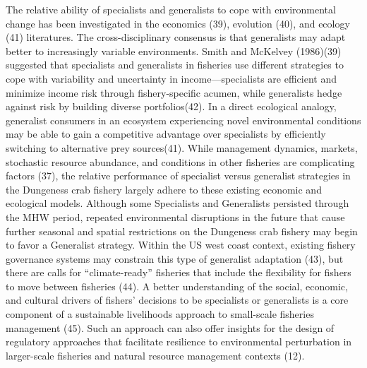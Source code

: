 \documentclass[9pt,twocolumn,twoside,lineno]{pnas-new}
\begin{document}
The relative ability of specialists and generalists to cope with
environmental change has been investigated in the economics (39),
evolution (40), and ecology (41) literatures. The cross-disciplinary
consensus is that generalists may adapt better to increasingly variable
environments. Smith and McKelvey (1986)(39) suggested that specialists
and generalists in fisheries use different strategies to cope with
variability and uncertainty in income---specialists are efficient and
minimize income risk through fishery-specific acumen, while generalists
hedge against risk by building diverse portfolios(42). In a direct
ecological analogy, generalist consumers in an ecosystem experiencing
novel environmental conditions may be able to gain a competitive
advantage over specialists by efficiently switching to alternative prey
sources(41). While management dynamics, markets, stochastic resource
abundance, and conditions in other fisheries are complicating factors
(37), the relative performance of specialist versus generalist
strategies in the Dungeness crab fishery largely adhere to these
existing economic and ecological models. Although some Specialists and
Generalists persisted through the MHW period, repeated environmental
disruptions in the future that cause further seasonal and spatial
restrictions on the Dungeness crab fishery may begin to favor a
Generalist strategy. Within the US west coast context, existing fishery
governance systems may constrain this type of generalist adaptation
(43), but there are calls for ``climate-ready'' fisheries that include
the flexibility for fishers to move between fisheries (44). A better
understanding of the social, economic, and cultural drivers of fishers'
decisions to be specialists or generalists is a core component of a
sustainable livelihoods approach to small-scale fisheries management
(45). Such an approach can also offer insights for the design of
regulatory approaches that facilitate resilience to environmental
perturbation in larger-scale fisheries and natural resource management
contexts (12).
\end{document}

